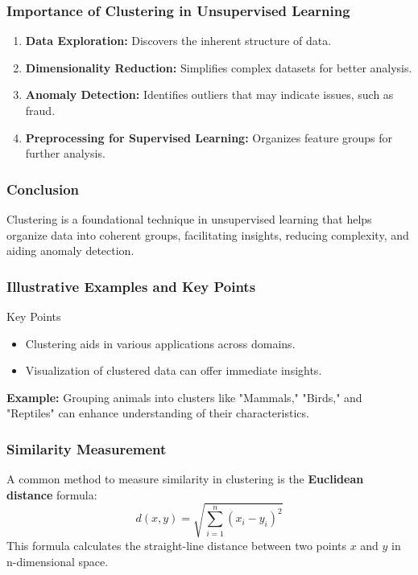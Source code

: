 \documentclass[aspectratio=169]{beamer}
\begin{document}
\begin{frame}[fragile]
    \frametitle{Importance of Clustering in Unsupervised Learning}
    \begin{enumerate}
        \item \textbf{Data Exploration:} Discovers the inherent structure of data.
        \item \textbf{Dimensionality Reduction:} Simplifies complex datasets for better analysis.
        \item \textbf{Anomaly Detection:} Identifies outliers that may indicate issues, such as fraud.
        \item \textbf{Preprocessing for Supervised Learning:} Organizes feature groups for further analysis.
    \end{enumerate}
\end{frame}

\begin{frame}[fragile]
    \frametitle{Conclusion}
    Clustering is a foundational technique in unsupervised learning that helps organize data into coherent groups, facilitating insights, reducing complexity, and aiding anomaly detection. 
\end{frame}

\begin{frame}[fragile]
    \frametitle{Illustrative Examples and Key Points}
    \begin{block}{Key Points}
        \begin{itemize}
            \item Clustering aids in various applications across domains.
            \item Visualization of clustered data can offer immediate insights.
        \end{itemize}
    \end{block}
    
    \textbf{Example:} Grouping animals into clusters like "Mammals," "Birds," and "Reptiles" can enhance understanding of their characteristics.
\end{frame}

\begin{frame}[fragile]
    \frametitle{Similarity Measurement}
    A common method to measure similarity in clustering is the \textbf{Euclidean distance} formula:
    \begin{equation}
        d(x, y) = \sqrt{\sum_{i=1}^{n} (x_i - y_i)^2}
    \end{equation}
    This formula calculates the straight-line distance between two points \(x\) and \(y\) in n-dimensional space.
\end{frame}
\end{document}
